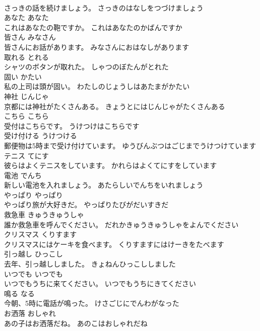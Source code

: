 \documentclass[8pt]{extreport}
\begin{document}
\begin{CJK}{UTF8}{min}
\\	さっきの話を続けましょう。	さっきのはなしをつづけましょう	
\\	あなた	あなた	
\\	これはあなたの鞄ですか。	これはあなたのかばんですか	
\\	皆さん	みなさん	
\\	皆さんにお話があります。	みなさんにおはなしがあります	
\\	取れる	とれる	
\\	シャツのボタンが取れた。	しゃつのぼたんがとれた	
\\	固い	かたい	
\\	私の上司は頭が固い。	わたしのじょうしはあたまがかたい	
\\	神社	じんじゃ	
\\	京都には神社がたくさんある。	きょうとにはじんじゃがたくさんある	
\\	こちら	こちら	
\\	受付はこちらです。	うけつけはこちらです	
\\	受け付ける	うけつける	
\\	郵便物は5時まで受け付けています。	ゆうびんぶつはごじまでうけつけています	
\\	テニス	てにす	
\\	彼らはよくテニスをしています。	かれらはよくてにすをしています	
\\	電池	でんち	
\\	新しい電池を入れましょう。	あたらしいでんちをいれましょう	
\\	やっぱり	やっぱり	
\\	やっぱり旅が大好きだ。	やっぱりたびがだいすきだ	
\\	救急車	きゅうきゅうしゃ	
\\	誰か救急車を呼んでください。	だれかきゅうきゅうしゃをよんでください	
\\	クリスマス	くりすます	
\\	クリスマスにはケーキを食べます。	くりすますにはけーきをたべます	
\\	引っ越し	ひっこし	
\\	去年、引っ越ししました。	きょねんひっこししました	
\\	いつでも	いつでも	
\\	いつでもうちに来てください。	いつでもうちにきてください	
\\	鳴る	なる	
\\	今朝、5時に電話が鳴った。	けさごじにでんわがなった	
\\	お洒落	おしゃれ	
\\	あの子はお洒落だね。	あのこはおしゃれだね	

\end{CJK}
\end{document}
